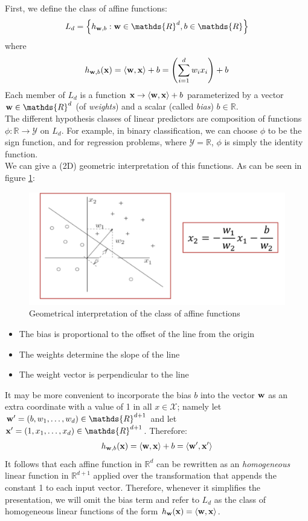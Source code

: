 \documentclass[12pt]{report}
\theoremstyle{plain}
\newcommand\mcl[1]{\mathcal{#1}}
\newcommand\sprod[2]{\langle \vb{#1},\vb{#2}\rangle}
\begin{document}
\begin{flushleft}
First, we define the class of affine functions:
\[ L_d=\left\{h_{\vb{w},b}:\vb{w}\in\mathds{R}^d,b\in\mathds{R} \right\} \]
where
\[ h_{\vb{w},b}(\vb{x})= \sprod{w}{x}+b = \left(\sum_{i=1}^d w_ix_i\right)+b \]
Each member of $L_d$ is a function $\vb{x}\to\sprod{w}{x}+b$ parameterized by a 
vector $\vb{w}\in\mathds{R}^d$ (of \textit{weights}) and a scalar (called 
\textit{bias}) $b\in\mathds{R}$.\\
The different hypothesis classes of linear predictors are composition of functions $\phi:\mathds{R}\to\mcl{Y}$ on $L_d$. For example, in binary classification, we can choose $\phi$ to be the sign function, and for regression problems, where $\mcl{Y}=\mathds{R}$, $\phi$ is simply the identity function.\\
We can give a (2D) geometric interpretation of this functions. As can be seen in figure \ref{fig:affine_geom}:
\begin{figure}[!h]
	\centering
	\includegraphics[scale=0.5]{images/affine_geometry.pdf}
	\caption{Geometrical interpretation of the class of affine functions}
	\label{fig:affine_geom}
\end{figure}
\begin{itemize}
	\item The bias is proportional to the offset of the line from the origin
	\item The weights determine the slope of the line
	\item The weight vector is perpendicular to the line
\end{itemize} 
It may be more convenient to incorporate the bias $b$ into the vector $\vb{w}$ 
as an extra coordinate with a value of 1 in all $x\in\mcl{X}$; namely let 
$\vb{w}'=(b,w_1,\dots,w_d)\in\mathds{R}^{d+1}$ and let 
$\vb{x}'=(1,x_1,\dots,x_d)\in\mathds{R}^{d+1}$. Therefore:
\[ h_{\vb{w},b}(\vb{x})=\sprod{w}{x}+b=\sprod{w'}{x'} \]
It follows that each affine function in $\mathds{R}^d$ can be rewritten as an 
\textit{homogeneous} linear function in $\mathds{R}^{d+1}$ applied over the 
transformation that appends the constant 1 to each input vector. Therefore, 
whenever it simplifies the presentation, we will omit the bias term and refer 
to $L_d$ as the class of homogeneous linear functions of the form 
$h_{\vb{w}}(\vb{x})=\sprod{w}{x}$.


\end{flushleft}
\end{document}
